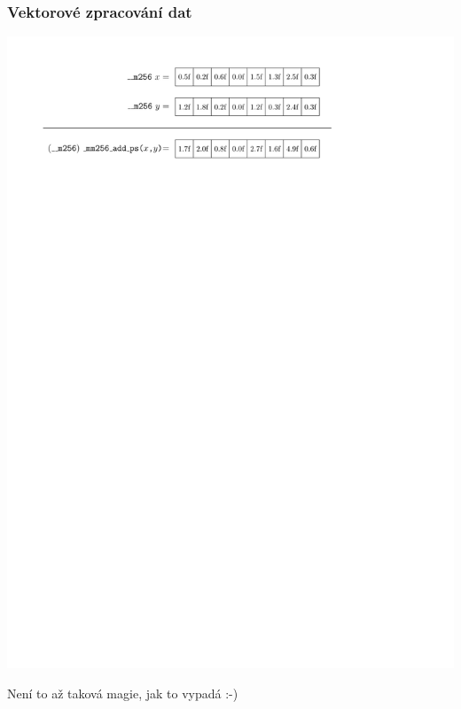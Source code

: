 \documentclass[usenames,dvipsnames,9pt]{beamer}
\begin{document}
\begin{frame}
  \frametitle{Vektorové zpracování dat}
  \begin{center}
    \includegraphics[width=0.95\linewidth]{07/figs/vectorized.pdf}
  \end{center}
  \pause
  \vspace{1.5em}
  \begin{center}
    \LARGE Není to až taková magie, jak to vypadá :-)
  \end{center}
\end{frame}
\end{document}
